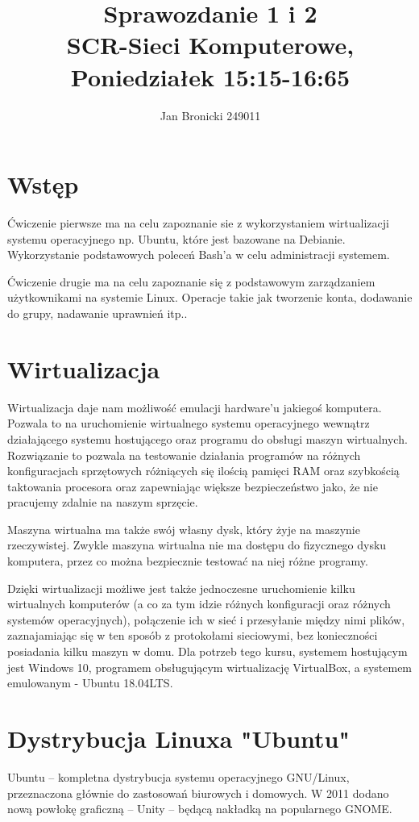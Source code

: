 \documentclass{article}
\title{
    Sprawozdanie 1 i 2\\

    \Large SCR-Sieci Komputerowe,\\

    Poniedziałek 15:15-16:65
}
\author{Jan Bronicki 249011 }
\date{}
\begin{document}
\maketitle


\section{Wstęp}\par
Ćwiczenie pierwsze ma na celu zapoznanie sie z wykorzystaniem wirtualizacji systemu operacyjnego np. Ubuntu, które jest bazowane na Debianie. Wykorzystanie podstawowych poleceń Bash'a w celu administracji systemem.\par
Ćwiczenie drugie ma na celu zapoznanie się z podstawowym zarządzaniem użytkownikami na systemie Linux. Operacje takie jak tworzenie konta, dodawanie do grupy, nadawanie uprawnień itp..

\section{Wirtualizacja}
Wirtualizacja daje nam możliwość emulacji hardware'u jakiegoś komputera. Pozwala to na uruchomienie wirtualnego systemu operacyjnego wewnątrz
działającego systemu hostującego oraz programu do obsługi maszyn wirtualnych. Rozwiązanie to pozwala na testowanie działania programów na różnych
konfiguracjach sprzętowych różniących się ilością pamięci RAM oraz szybkością taktowania procesora oraz zapewniając większe bezpieczeństwo jako, że nie pracujemy zdalnie na naszym sprzęcie. \par 

Maszyna wirtualna ma także swój własny dysk, który żyje na maszynie rzeczywistej. Zwykle maszyna wirtualna nie ma dostępu do fizycznego dysku komputera, przez co można bezpiecznie testować na niej różne programy.\par

Dzięki wirtualizacji możliwe jest także jednoczesne uruchomienie kilku wirtualnych
komputerów (a co za tym idzie różnych konfiguracji oraz różnych systemów operacyjnych), połączenie ich w sieć i przesyłanie między nimi plików, zaznajamiając
się w ten sposób z protokołami sieciowymi, bez konieczności posiadania kilku maszyn
w domu. Dla potrzeb tego kursu, systemem hostującym jest Windows 10, programem
obsługującym wirtualizację VirtualBox, a systemem emulowanym - Ubuntu 18.04LTS.

\section{Dystrybucja Linuxa "Ubuntu"}
Ubuntu – kompletna dystrybucja systemu operacyjnego GNU/Linux, przeznaczona głównie do zastosowań biurowych i domowych. W 2011 dodano nową powłokę graficzną – Unity – będącą nakładką na popularnego GNOME.
\end{document}
